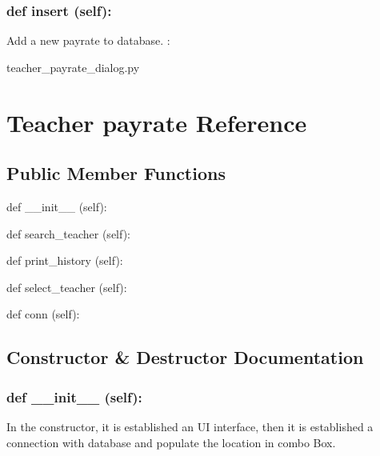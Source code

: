 \hypertarget{class_poly_a14a7ad77ce612b0c54f531d307ee4b39}{
\subsubsection[{def insert (self):}]{\setlength{\rightskip}{0pt plus 5cm}def {insert} (self):}}\label{class_poly_a14a7ad77ce612b0c54f531d307ee4b39}
Add a new payrate to database.
:\begin{DoxyCompactItemize}
\item 
teacher\_payrate\_dialog.\-py\end{DoxyCompactItemize}


\hypertarget{Teacher_payrate}{\section{Teacher payrate Reference}
\label{Teacher_payrate}
}
\subsection*{Public Member Functions}
\begin{DoxyCompactItemize}
\item 
def {\_\_init\_\_} (self):
\item 
def {search\_teacher} (self):
\item 
def {print\_history} (self):
\item 
def {select\_teacher} (self):
\item 
def {conn} (self):
\end{DoxyCompactItemize}

\subsection{Constructor \& Destructor Documentation}
\hypertarget{class_poly_aa3def076b74bed67904976ad4f9fe9b1}{
\subsubsection[{def __init__ (self):}]{\setlength{\rightskip}{0pt plus 5cm}def {\_\_init\_\_} (self): 
}}
In the constructor, it is established an UI interface, then it is  established a connection with database and populate the location in combo Box.
 

